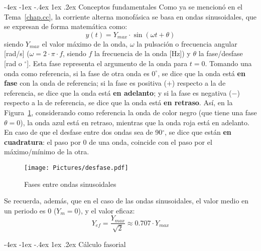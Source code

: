 \documentclass[11pt]{book} %
\makeatletter
\numberwithin{dummy}{section}
\theoremstyle{ocrenumbox}
\theoremstyle{blacknumex}
\theoremstyle{blacknumbox}
\theoremstyle{ocrenum}
\renewcommand{\section}{\@startsection{section}{1}{\z@}
{-4ex \@plus -1ex \@minus -.4ex}
{1ex \@plus.2ex }
{\normalfont\large\sffamily\bfseries}}
\newlength\esp
\makeatother
\begin{document}
	\section{Conceptos fundamentales}
	Como ya se mencionó en el Tema~\ref{chap.cc}, la corriente alterna monofásica se basa en ondas sinusoidales, que se expresan de forma matemática como:
	\begin{equation}\label{eq.y_senoidal}
		\boxed{y(t)=Y_{max}\cdot\sin(\omega t+\theta)} 
	\end{equation}
	siendo $Y_{max}$ el valor máximo de la onda, $\omega$ la pulsación o frecuencia angular [rad/s] ($\omega=2\cdot\pi\cdot f$, siendo $f$ la frecuencia de la onda [Hz]) y $\theta$ la fase/desfase [rad o $^\circ$]. Esta fase representa el argumento de la onda para $t=0$. Tomando una onda como referencia, si la fase de otra onda es $0^\circ$, se dice que la onda está \textbf{en fase} con la onda de referencia; si la fase es positiva ($+$) respecto a la de referencia, se dice que la onda está \textbf{en adelanto}; y si la fase es negativa ($-$) respecto a la de referencia, se dice que la onda está \textbf{en retraso}. Así, en la Figura~\ref{fig.desfase}, considerando como referencia la onda de color negro (que tiene una fase $\theta=0$), la {\color{blue} onda azul} está en retraso, mientras que la {\color{red} onda roja} está en adelanto. En caso de que el desfase entre dos ondas sea de 90$^\circ$, se dice que están \textbf{en cuadratura}: el paso por 0 de una onda, coincide con el paso por el máximo/mínimo de la otra.
	\begin{figure}[htbp]
		\centering
		\texttt{[image: Pictures/desfase.pdf]}
		\caption{Fases entre ondas sinusoidales}
		\label{fig.desfase}
	\end{figure}
	
	Se recuerda, además, que en el caso de las ondas sinusoidales, el valor medio en un periodo es 0 ($Y_m=0$), y el valor eficaz: 
	\begin{equation}
		\boxed{Y_{ef}=\dfrac{Y_{max}}{\sqrt{2}}\approx0.707\cdot Y_{max}}
	\end{equation}
	
	\section{Cálculo fasorial}
	
\end{document}

